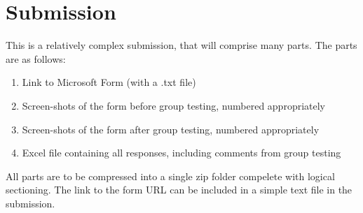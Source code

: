\section*{Submission}
This is a relatively complex submission, that will comprise many parts.  The parts are as follows:
\begin{enumerate}
	\item Link to Microsoft Form (with a .txt file)
	\item Screen-shots of the form before group testing, numbered appropriately
	\item Screen-shots of the form after group testing, numbered appropriately
	\item Excel file containing all responses, including comments from group testing
\end{enumerate}

All parts are to be compressed into a single zip folder compelete with logical sectioning.  The link to the form URL can be included in a simple text file in the submission.


